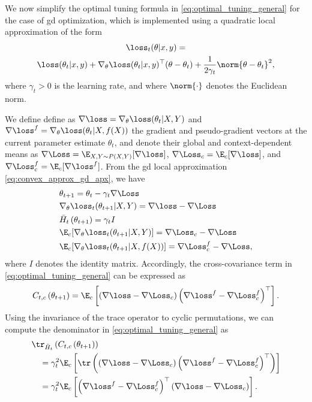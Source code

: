 \documentclass[journal]{IEEEtran}
\begin{document}
We now simplify the optimal tuning formula in \eqref{eq:optimal_tuning_general} for the case of \gls{gd} optimization, which is implemented using a quadratic local approximation of the form
\begin{multline}
\label{eq:convex_approx_gd_apx}
\loss_t(\theta| x, y) = \\
    \loss(\theta_t | x, y) + \nabla_\theta \loss(\theta_t | x, y)^\top (\theta - \theta_t) + \frac{1}{2 \gamma_t} \norm{\theta - \theta_t}^2,
\end{multline}
where $\gamma_t > 0$ is the learning rate, and where $\norm{\cdot}$ denotes the Euclidean norm.

We define define as $\nabla \loss = \nabla_\theta \loss(\theta_t | X, Y)$ and $\nabla \loss^f = \nabla_\theta \loss(\theta_t | X, f(X))$ the gradient and pseudo-gradient vectors at the current parameter estimate $\theta_t$, and denote their global and context-dependent means as $\nabla \Loss = \E_{X, Y \sim P(X,Y)}[\nabla \loss]$, $\nabla \Loss_c = \E_c[\nabla \loss]$, and $\nabla \Loss^f_c = \E_c[\nabla \loss^f]$.
From the \gls{gd} local approximation \eqref{eq:convex_approx_gd_apx}, we have
\begin{equation}
\begin{split}
    &\theta_{t+1} = \theta_t - \gamma_t \nabla \Loss \\
    &\nabla_\theta \loss_t(\theta_{t+1} | X, Y) = \nabla \loss - \nabla \Loss \\
    &\bar{H}_t\left( \theta_{t+1} \right) = \gamma_t I \\
    &\E_c[\nabla_\theta \loss_t(\theta_{t+1} | X, Y)] = \nabla \Loss_c - \nabla \Loss \\
    &\E_c[\nabla_\theta \loss_t(\theta_{t+1} | X, f(X))] = \nabla \Loss^f_c - \nabla \Loss,
\end{split}
\end{equation}
where $I$ denotes the identity matrix.
Accordingly, the cross-covariance term in \eqref{eq:optimal_tuning_general} can be expressed as
\begin{equation}
    C_{t, c}\left( \theta_{t+1} \right) = \E_c\left[
        \left( \nabla \loss - \nabla \Loss_c \right) 
        \left( \nabla \loss^f - \nabla \Loss^f_c \right)^\top
    \right].
\end{equation}
Using the invariance of the trace operator to cyclic permutations, we can compute the denominator in \eqref{eq:optimal_tuning_general} as 
\begin{equation}
\begin{split}
&\tr_{\bar{H}_t}\left(
    C_{t, c}\left( \theta_{t+1} \right)
\right) \\
    &\quad = \gamma_t^2 \E_c\left[
        \tr\left(
            \left( \nabla \loss - \nabla \Loss_c \right)
            \left( \nabla \loss^f - \nabla \Loss^f_c \right)^\top
        \right)
    \right] \\
    &\quad = \gamma_t^2 \E_c\left[
        \left( \nabla \loss^f - \nabla \Loss^f_c \right)^\top
        \left( \nabla \loss - \nabla \Loss_c \right)
    \right].
\end{split}
\end{equation}
\end{document}
